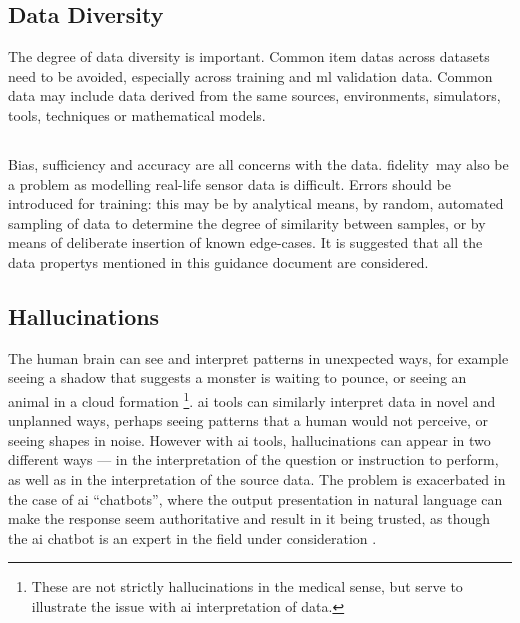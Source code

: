 \subsection{Data Diversity}
The degree of data diversity is important. Common \glspl{item data} across \glspl{dataset} need to be avoided, especially across training and
\gls{ml}
validation data. Common data may include data derived from the same sources, environments, simulators, tools, techniques or mathematical models.

\subsection{}
Bias, sufficiency and \gls{accuracy} are all concerns with the data. \cbstart\gls{fidelity}\cbend\ may also be a problem as modelling real-life sensor data is difficult.  Errors should be introduced for training: this may be by analytical means, by random, automated sampling of data to determine the degree of similarity between samples, or by means of deliberate insertion of known edge-cases. 
It is suggested that all the \glspl{data property} mentioned in this guidance document are considered.

\subsection{Hallucinations}
\label{bkm:MachineLearning:Hallucinations}
%
The human brain can see and interpret patterns in unexpected ways, for example seeing a shadow that
suggests a monster is waiting to pounce, or seeing an animal in a cloud formation%
\footnote{These are not strictly hallucinations in the medical sense, but serve to illustrate
the issue with \gls{ai} interpretation of data.}.
\Gls{ai} tools can similarly interpret data in novel and unplanned ways, perhaps seeing patterns that a
human would not perceive, or seeing shapes in noise. However with \gls{ai} tools, hallucinations can appear
in two different ways --- in the interpretation of the question or instruction to perform, as well as
in the interpretation of the source data.
The problem is exacerbated in the case of \gls{ai} ``chatbots'', where the output presentation in natural
language can make the response seem authoritative and result in it being trusted, as though the
\gls{ai} chatbot is an expert in the field under consideration \cite{citation:chatbotsterrible:website}. 

